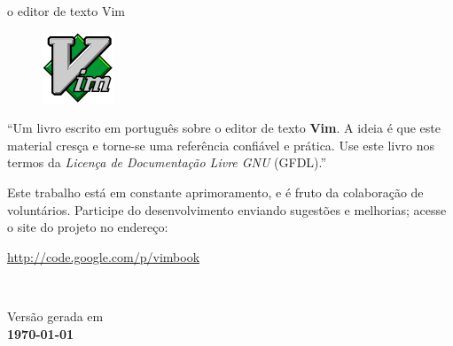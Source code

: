 \documentclass[10pt,a4paper,openany]{book}
\begin{document}
\thispagestyle{empty}
\begin{center}

{\Huge \sc o editor de texto Vim}

  \vspace{2cm}
  \begin{figure}[h]
    \center
    \includegraphics{img/vimlogo.png}
    \label{logodovim}
\end{figure}

   \vspace{5cm}
   \begin{flushright}
   \begin{minipage}[t]{8cm}
          ``Um livro escrito em português sobre o editor de texto {\bf Vim}. A ideia é que este
          material cresça e torne-se uma referência confiável
          e prática. Use este livro nos termos da {\em Licença de Documentação Livre GNU} (GFDL).'' \\
          \par Este trabalho está em constante aprimoramento, e é fruto da
          colaboração de voluntários. Participe do desenvolvimento enviando sugestões e
          melhorias; acesse o site do projeto no endereço: \\
\begin{center}
          \url{http://code.google.com/p/vimbook}
\end{center}
        
   \end{minipage} \\
   \end{flushright}

   \vspace{3cm}

   {\small Versão gerada em \\ \bf \today}
\end{center}

\newpage
\thispagestyle{empty}
\end{document}
